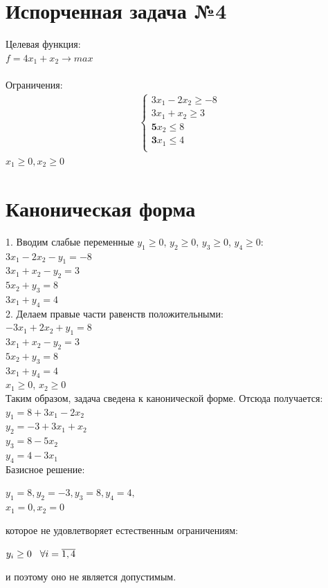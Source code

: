 \documentclass[14pt,a4paper,fleqn]{extarticle}
\begin{document}
	\section*{Испорченная задача №4}
	
	Целевая функция:\\
	$f = 4x_1 + x_2 \longrightarrow max$\\\\
	Ограничения:
	\begin{align*}
		\begin{cases}
			3x_1 - 2x_2 \geq -8\\
			3x_1 + x_2 \geq 3\\
			\boldsymbol{5} x_2 \leq 8\\
			\boldsymbol{3} x_1 \leq 4\\
		\end{cases}
	\end{align*}
	$x_1 \geq 0, x_2 \geq 0$
	\section*{Каноническая форма}
	1. Вводим слабые переменные $y_1 \geq 0$, $y_2 \geq 0$, $y_3 \geq 0$, $y_4 \geq 0$:\\
	$3x_1 - 2x_2 - y_1 = -8$\\
	$3x_1 + x_2 - y_2 = 3$\\
	$5x_2 + y_3 = 8$\\
	$3x_1 + y_4 = 4$\\
	
	2. Делаем правые части равенств положительными:\\
	$-3x_1 + 2x_2 + y_1 = 8$\\
	$3x_1 + x_2 - y_2 = 3$\\
	$5x_2 + y_3 = 8$\\
	$3x_1 + y_4 = 4$\\
	$x_1 \geq 0$, $x_2 \geq 0$\\
	
	Таким образом, задача сведена к канонической форме.
	\newpage
	Отсюда получается:\\
	$y_1 = 8 + 3x_1 - 2x_2$\\
	$y_2 = -3 + 3x_1 + x_2$\\
	$y_3 = 8 - 5x_2$\\
	$y_4 = 4 - 3x_1$\\
	
	Базисное решение:
	\begin{center}
		$y_1 = 8, y_2 = -3, y_3 = 8, y_4 = 4,$\\
		$x_1 = 0, x_2 = 0$
	\end{center}
	которое не удовлетворяет естественным ограничениям:
	\begin{center}
		$y_i \geq 0 \hspace*{0.3cm} \forall i = \overline{1,4}$
	\end{center}
	и поэтому оно не является допустимым.
	
\end{document}
